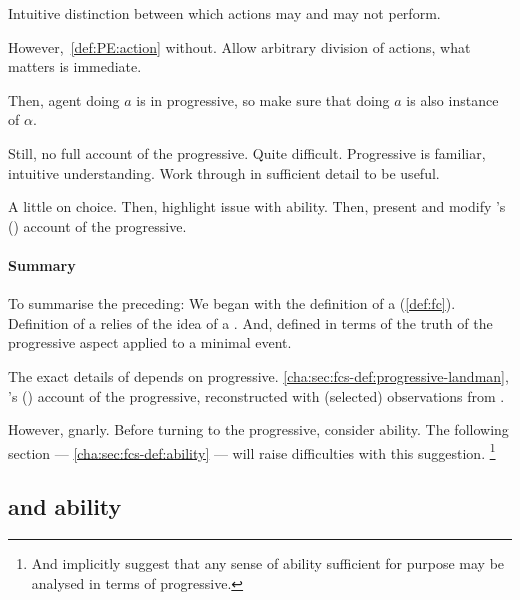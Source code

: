 \begin{note}
  Intuitive distinction between which actions may and may not perform.

  However,~\ref{def:PE:action} without.
  Allow arbitrary division of actions, what matters is immediate.

  Then, agent doing \(a\) is in progressive, so make sure that doing \(a\) is also instance of \(\alpha\).
\end{note}


\begin{note}
  Still, no full account of the progressive.
  Quite difficult.
  Progressive is familiar, intuitive understanding.
  Work through in sufficient detail to be useful.

  A little on choice.
  Then, highlight issue with ability.
  Then, present and modify \citeauthor{Landman:1992wh}'s (\citeyear{Landman:1992wh}) account of the progressive.
\end{note}

\paragraph*{Summary}

\begin{note}[Summarising]
  To summarise the preceding:
  We began with the definition of a \fc{} (\autoref{def:fc}).
  Definition of a \fc{} relies of the idea of a \pevent{}.
  And, defined \pevent{} in terms of the truth of the progressive aspect applied to a minimal event.

  The exact details of \pevent{} depends on progressive.
  \autoref{cha:sec:fcs-def:progressive-landman}, \citeauthor{Landman:1992wh}'s (\citeyear{Landman:1992wh}) account of the progressive, reconstructed with (selected) observations from \textcite{Szabo:2004ul}.

  However, gnarly.
  Before turning to the progressive, consider ability.
  The following section --- \autoref{cha:sec:fcs-def:ability} --- will raise difficulties with this suggestion.%
  \footnote{
    And implicitly suggest that any sense of ability sufficient for purpose may be analysed in terms of progressive.
  }
\end{note}

\subsection{ and ability}
\label{cha:sec:fcs-def:ability}

